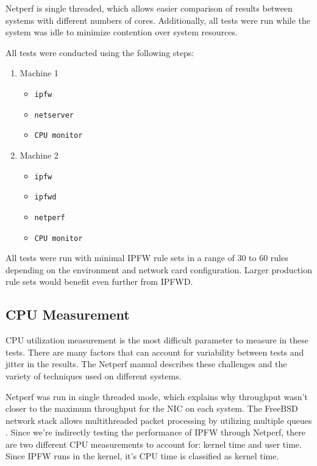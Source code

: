 \documentclass[journal]{IEEEtran}
\begin{document}
    Netperf is single threaded, which allows easier comparison of results
    between systems with different numbers of cores. Additionally, all tests
    were run while the system was idle to minimize contention over system
    resources. 

    All tests were conducted using the following steps:
    \begin{enumerate}
        \item Machine 1
        \begin{itemize}
          \item \texttt{ipfw}
          \item \texttt{netserver}
          \item \texttt{CPU monitor}
        \end{itemize}
        \item Machine 2
        \begin{itemize}
          \item \texttt{ipfw}
          \item \texttt{ipfwd}
          \item \texttt{netperf}
          \item \texttt{CPU monitor}
        \end{itemize}
    \end{enumerate}

    All tests were run with minimal IPFW rule sets in a range of 30 to 60 rules
    depending on the environment and network card configuration. Larger
    production rule sets would benefit even further from IPFWD.

  \subsection{CPU Measurement}

    CPU utilization measurement is the most difficult parameter to measure in
    these tests. There are many factors that can account for variability
    between tests and jitter in the results. The Netperf manual describes these
    challenges and the variety of techniques used on different systems.
    \cite{netperf}

    Netperf was run in single threaded mode, which explains why throughput
    wasn't closer to the maximum throughput for the NIC on each system. The
    FreeBSD network stack allows multithreaded packet processing by utilizing
    multiple queues \cite{freebsdhandbook}. Since we're indirectly testing the
    performance of IPFW through Netperf, there are two different CPU
    measurements to account for: kernel time and user time. Since IPFW runs in
    the kernel, it's CPU time is classified as kernel time.
\end{document}
